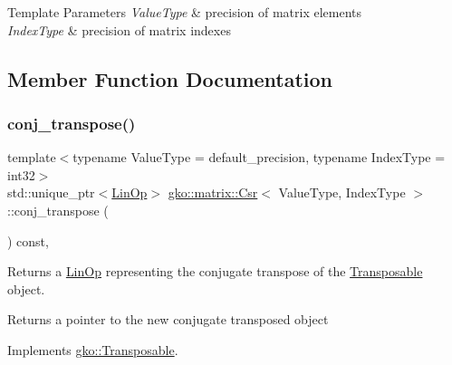 \begin{DoxyTemplParams}{Template Parameters}
{\em Value\+Type} & precision of matrix elements \\
\hline
{\em Index\+Type} & precision of matrix indexes \\
\hline
\end{DoxyTemplParams}


\subsection{Member Function Documentation}
\mbox{\label{classgko_1_1matrix_1_1Csr_a38820451af5424f18b767667f3067d72}} 
\subsubsection{\texorpdfstring{conj\+\_\+transpose()}{conj\_transpose()}}
{\footnotesize\ttfamily template$<$typename Value\+Type = default\+\_\+precision, typename Index\+Type = int32$>$ \\
std\+::unique\+\_\+ptr$<$\hyperlink{classgko_1_1LinOp}{Lin\+Op}$>$ \hyperlink{classgko_1_1matrix_1_1Csr}{gko\+::matrix\+::\+Csr}$<$ Value\+Type, Index\+Type $>$\+::conj\+\_\+transpose (\begin{DoxyParamCaption}{ }\end{DoxyParamCaption}) const\hspace{0.3cm}{\ttfamily [override]}, {\ttfamily [virtual]}}



Returns a \hyperlink{classgko_1_1LinOp}{Lin\+Op} representing the conjugate transpose of the \hyperlink{classgko_1_1Transposable}{Transposable} object. 

\begin{DoxyReturn}{Returns}
a pointer to the new conjugate transposed object 
\end{DoxyReturn}


Implements \hyperlink{classgko_1_1Transposable_ab41b669288740cf2a6f7bf76e875b077}{gko\+::\+Transposable}.

\mbox{\label{classgko_1_1matrix_1_1Csr_a81c6294177a1be4873804c8a85a9fc64}} 
